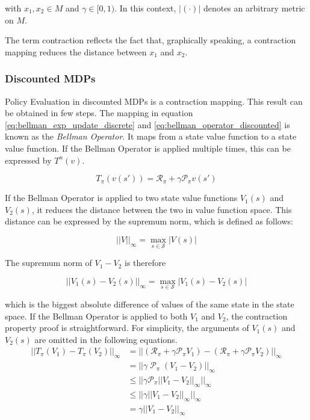 with $x_1,x_2 \in M$ and $\gamma \in [0,1)$. In this context,  $|(\cdot)|$ denotes an arbitrary metric on $M$.

The term contraction reflects the fact that, graphically speaking, a contraction mapping reduces the distance between $x_1$ and $x_2$.

\subsubsection*{Discounted MDPs}

Policy Evaluation in discounted MDPs is a contraction mapping. This result can be obtained in few steps. The mapping in equation \ref{eq:bellman_exp_update_discrete} and \ref{eq:bellman_operator_discounted} is known as the \textit{Bellman Operator}. It maps from a state value function to a state value function. If the Bellman Operator is applied multiple times, this can be expressed by $T^n(v)$.

\begin{equation}
T_\pi(v(s'))=\mathcal{R}_\pi+\gamma \mathcal{P}_\pi v(s')
\label{eq:bellman_operator_discounted}
\end{equation}

If the Bellman Operator is applied to two state value functions $V_1(s)$ and $V_2(s)$, it reduces the distance between the two in value function space. This distance can be expressed by the supremum norm, which is defined as follows:

\begin{equation}
||V||_\infty = \max_{s \in \mathcal{S}} |V(s)|
\end{equation}

The supremum norm of $V_1 - V_2$ is therefore

\begin{equation}
||V_1(s) - V_2(s)||_\infty = \max_{s \in \mathcal{S}} |V_1(s)-V_2(s)|
\end{equation}

which is the biggest absolute difference of values of the same state in the state space. If the Bellman Operator is applied to both $V_1$ and $V_2$, the contraction property proof is straightforward. For simplicity, the arguments of $V_1(s)$ and $V_2(s)$ are omitted in the following equations.
\begin{align}
||T_\pi(V_1)-T_\pi(V_2)||_\infty &= ||(\mathcal{R}_\pi+\gamma \mathcal{P}_\pi V_1)-(\mathcal{R}_\pi+\gamma \mathcal{P}_\pi V_2)||_\infty \label{eq:4.15}\\
&=||\gamma\; \mathcal{P}_\pi\;(V_1 - V_2)||_\infty \label{eq:4.16}\\
&\leq ||\gamma \mathcal{P}_\pi ||V_1 - V_2||_\infty ||_\infty \label{eq:4.17} \\
&\leq ||\gamma ||V_1 - V_2||_\infty ||_\infty \label{eq:4.18}\\
&=\gamma ||V_1 - V_2||_\infty \label{eq:4.19}
\end{align} 

